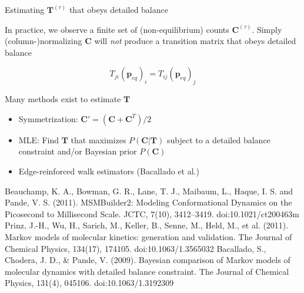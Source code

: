 \documentclass{beamer}
\begin{document}
\begin{frame}{Estimating $\mathbf{T}^{(\tau)}$ that obeys detailed balance}

In practice, we observe a finite set of (non-equilibrium) counts $\mathbf{C}^{(\tau)}$.  Simply (column-)normalizing $\mathbf{C}$ will \textit{not} produce a transition matrix that obeys detailed balance

$$ T_{ji} (\mathbf{p}_{eq})_i = T_{ij} (\mathbf{p}_{eq})_j    $$

Many methods exist to estimate $\mathbf{T}$

\begin{itemize}
    \item Symmetrization: $\mathbf{C}' = (\mathbf{C} + \mathbf{C}^T)/2$
    \item MLE: Find $\mathbf{T}$ that maximizes $P(\mathbf{C}|\mathbf{T})$ subject to a detailed balance constraint and/or Bayesian prior $P(\mathbf{C})$
    \item Edge-reinforced walk estimators (Bacallado et al.)
\end{itemize}


\tiny
Beauchamp, K. A., Bowman, G. R., Lane, T. J., Maibaum, L., Haque, I. S. and Pande, V. S. (2011). MSMBuilder2: Modeling Conformational Dynamics on the Picosecond to Millisecond Scale. JCTC, 7(10), 3412–3419. doi:10.1021/ct200463m
Prinz, J.-H., Wu, H., Sarich, M., Keller, B., Senne, M., Held, M., et al. (2011). Markov models of molecular kinetics: generation and validation. The Journal of Chemical Physics, 134(17), 174105. doi:10.1063/1.3565032
Bacallado, S., Chodera, J. D., \& Pande, V. (2009). Bayesian comparison of Markov models of molecular dynamics with detailed balance constraint. The Journal of Chemical Physics, 131(4), 045106. doi:10.1063/1.3192309

\end{frame}
\end{document}
